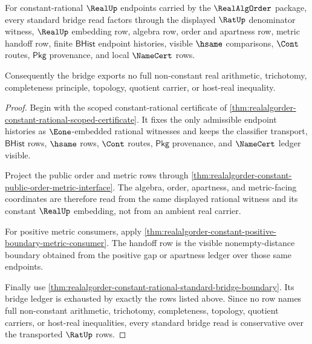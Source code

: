 \begin{theorem}
\label{thm:realalgorder-standard-bridge-row-conservativity}
For constant-rational $\RealUp$ endpoints carried by the
$\RealAlgOrder$ package, every standard bridge read factors through the
displayed $\RatUp$ denominator witness, $\RealUp$ embedding row,
algebra row, order and apartness row, metric handoff row, finite
$\mathsf{BHist}$ endpoint histories, visible $\hsame$ comparisons,
$\Cont$ routes, $\mathsf{Pkg}$ provenance, and local $\NameCert$ rows.

Consequently the bridge exports no full non-constant real arithmetic,
trichotomy, completeness principle, topology, quotient carrier, or
host-real inequality.
\end{theorem}
\begin{proof}
Begin with the scoped constant-rational certificate of
\autoref{thm:realalgorder-constant-rational-scoped-certificate}. It fixes the
only admissible endpoint histories as $\Eone$-embedded rational witnesses and
keeps the classifier transport, $\mathsf{BHist}$ rows, $\hsame$ rows,
$\Cont$ routes, $\mathsf{Pkg}$ provenance, and $\NameCert$ ledger visible.

Project the public order and metric rows through
\autoref{thm:realalgorder-constant-public-order-metric-interface}. The algebra,
order, apartness, and metric-facing coordinates are therefore read from the
same displayed rational witness and its constant $\RealUp$ embedding, not from
an ambient real carrier.

For positive metric consumers, apply
\autoref{thm:realalgorder-constant-positive-boundary-metric-consumer}. The handoff row is
the visible nonempty-distance boundary obtained from the positive gap or
apartness ledger over those same endpoints.

Finally use
\autoref{thm:realalgorder-constant-rational-standard-bridge-boundary}. Its
bridge ledger is exhausted by exactly the rows listed above. Since no row names
full non-constant arithmetic, trichotomy, completeness, topology, quotient
carriers, or host-real inequalities, every standard bridge read is conservative
over the transported $\RatUp$ rows.
\end{proof}

